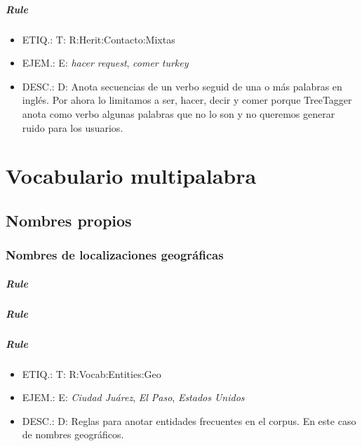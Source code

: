 \documentclass[11pt]{report}
\begin{document}
\paragraph*{Rule}
\begin{itemize}
\item ETIQ.:  T: R:Herit:Contacto:Mixtas
\item EJEM.:  E: \emph{hacer request}, \emph{comer turkey}
\item DESC.:  D: Anota secuencias de un verbo seguid de una o más palabras en inglés. Por ahora lo limitamos a ser, hacer, decir y comer porque TreeTagger anota como verbo algunas palabras que no lo son y no queremos generar ruido para los usuarios.
\end{itemize}

\chapter{Vocabulario multipalabra}
\section{Nombres propios}
\subsection{Nombres de localizaciones geográficas}
\paragraph*{Rule}
\paragraph*{Rule}
\paragraph*{Rule}
\begin{itemize}
\item ETIQ.:  T: R:Vocab:Entities:Geo
\item EJEM.:  E: \emph{Ciudad Juárez}, \emph{El Paso}, \emph{Estados Unidos}  
\item DESC.:  D: Reglas para anotar entidades frecuentes en el corpus. En este caso de nombres geográficos.
\end{itemize}
\end{document}
